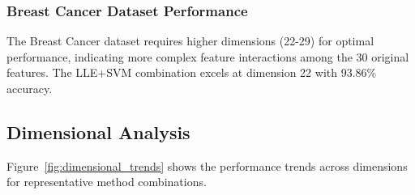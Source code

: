 \documentclass[review]{elsarticle}
\begin{document}
\subsubsection{Breast Cancer Dataset Performance}

The Breast Cancer dataset requires higher dimensions (22-29) for optimal performance, indicating more complex feature interactions among the 30 original features. The LLE+SVM combination excels at dimension 22 with 93.86\% accuracy.

\subsection{Dimensional Analysis}

Figure~\ref{fig:dimensional_trends} shows the performance trends across dimensions for representative method combinations.
\end{document}
